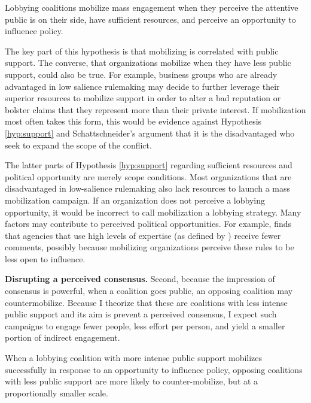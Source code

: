 \begin{subhyp}

\begin{hyp} \label{hyp:support}
Lobbying coalitions mobilize mass engagement when they perceive the attentive public is on their side, have sufficient resources, and perceive an opportunity to influence policy.
\end{hyp}

The key part of this hypothesis is that mobilizing is correlated with public support. The converse, that organizations mobilize when they have less public support, could also be true. For example, business groups who are already advantaged in low salience rulemaking may decide to further leverage their superior resources to mobilize support in order to alter a bad reputation or bolster claims that they represent more than their private interest. If mobilization most often takes this form, this would be evidence against Hypothesis \ref{hyp:support} and Schattschneider's argument that it is the disadvantaged who seek to expand the scope of the conflict. 

The latter parts of Hypothesis \ref{hyp:support} regarding sufficient resources and political opportunity are merely scope conditions. Most organizations that are disadvantaged in low-salience rulemaking also lack resources to launch a mass mobilization campaign. If an organization does not perceive a lobbying opportunity, it would be incorrect to call mobilization a lobbying strategy. Many factors may contribute to perceived political opportunities. For example, \citet{Moore2017} finds that agencies that use high levels of expertise (as defined by \citet{Selin2015}) receive fewer comments, possibly because mobilizing organizations perceive these rules to be less open to influence. 

\textbf{Disrupting a perceived consensus.} Second, because the impression of consensus is powerful, when a coalition goes public, an opposing coalition may countermobilize. Because I theorize that these are coalitions with less intense public support and its aim is prevent a perceived consensus, I expect such campaigns to engage fewer people, less effort per person, and yield a smaller portion of indirect engagement. 


\begin{hyp} \label{hyp:disrupt}
When a lobbying coalition with more intense public support mobilizes successfully in response to an opportunity to influence policy, opposing coalitions with less public support are more likely to counter-mobilize, but at a proportionally smaller scale.
\end{hyp}


\end{subhyp}
